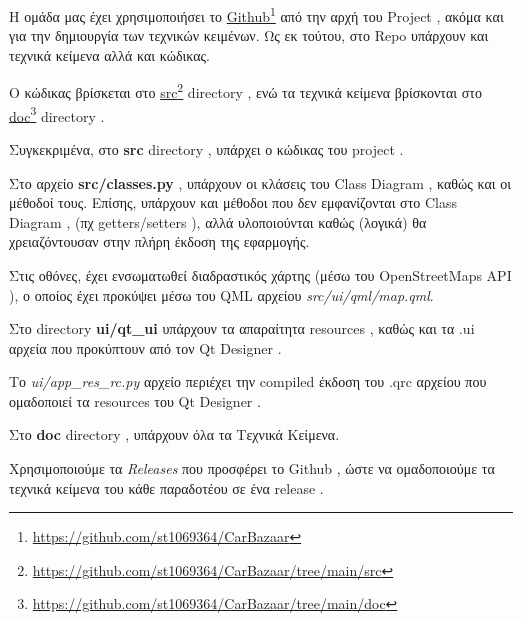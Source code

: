 \documentclass{../ol-softwaremanual}
\newcommand{\doclink}[2]{\href{#1}{#2}\footnote{\url{#1}}}
\begin{document}
	
	\newpage
	
	
	
	\flushleft
	
	Η ομάδα μας έχει χρησιμοποιήσει το \en \doclink{https://github.com/st1069364/CarBazaar}{Github} \gr από την αρχή του \en Project \gr, ακόμα και για την δημιουργία των τεχνικών κειμένων. Ως εκ τούτου, στο \en Repo \gr υπάρχουν και τεχνικά κείμενα αλλά και κώδικας. \break
	
	
	Ο κώδικας βρίσκεται στο \en \doclink{https://github.com/st1069364/CarBazaar/tree/main/src}{src} directory \gr, ενώ τα τεχνικά κείμενα βρίσκονται στο \en \doclink{https://github.com/st1069364/CarBazaar/tree/main/doc}{doc} directory \gr .\break
	
	Συγκεκριμένα, στο \en \textbf{src} directory \gr, υπάρχει ο κώδικας του \en project \gr. \break
	
	Στο αρχείο \en \textbf{src/classes.py} \gr, υπάρχουν οι κλάσεις του \en Class Diagram \gr, καθώς και οι μέθοδοί τους. Επίσης, υπάρχουν και μέθοδοι που δεν εμφανίζονται στο \en Class Diagram \gr, (πχ \en getters/setters \gr), αλλά υλοποιούνται καθώς (λογικά) θα χρειαζόντουσαν στην πλήρη έκδοση της εφαρμογής. \break	
	
	 \break

	Στις οθόνες, έχει ενσωματωθεί διαδραστικός χάρτης (μέσω του \en OpenStreetMaps API \gr), ο οποίος έχει προκύψει μέσω του \en QML \gr αρχείου \en \textit{src/ui/qml/map.qml}\gr. \break	
	
	Στο \en directory \textbf{ui/qt\_ui} \gr υπάρχουν τα απαραίτητα \en resources \gr, καθώς και τα \en .ui \gr αρχεία που προκύπτουν από τον \en Qt Designer \gr. \break	
	
	Το \en \textit{ui/app\_res\_rc.py} \gr αρχείο περιέχει την \en compiled \gr έκδοση του \en .qrc \gr αρχείου που ομαδοποιεί τα \en resources \gr του \en Qt Designer \gr. \break
	
	
	Στο \en \textbf{doc} directory \gr, υπάρχουν όλα τα Τεχνικά Κείμενα. \break
	
	Χρησιμοποιούμε τα \en \textit{Releases} \gr που προσφέρει το \en Github \gr, ώστε να ομαδοποιούμε τα τεχνικά κείμενα του κάθε παραδοτέου σε ένα \en release \gr .\break
	
	
	
	
	
	
	
	
	
	
	
\end{document}
